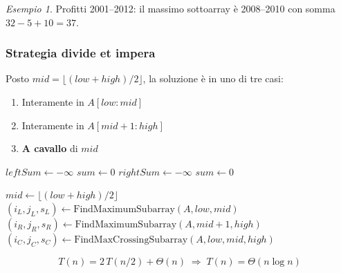 \documentclass[a4paper, 11pt]{article}
\theoremstyle{definition}
\theoremstyle{remark}
\newtheorem{esempio}{Esempio}[section]
\theoremstyle{remark}
\begin{document}
	\begin{esempio}
		Profitti 2001--2012: il massimo sottoarray è 2008--2010 con somma
		$32 - 5 + 10 = 37$.
	\end{esempio}
	
	\subsubsection*{Strategia divide et impera}
	
	Posto $mid = \lfloor(low+high)/2\rfloor$, la soluzione è in uno di tre casi:
	\begin{enumerate}
		\item Interamente in $A[low:mid]$
		\item Interamente in $A[mid+1:high]$
		\item \textbf{A cavallo} di $mid$
	\end{enumerate}
	
	\begin{algorithm}[H]
		\caption{FindMaxCrossingSubarray($A$, $low$, $mid$, $high$)}
		$\mathit{leftSum} \gets -\infty$\; $\mathit{sum} \gets 0$\;
		$\mathit{rightSum} \gets -\infty$\; $\mathit{sum} \gets 0$\;
		\;
	\end{algorithm}
	
	\begin{algorithm}[H]
		\caption{FindMaximumSubarray($A$, $low$, $high$)}
		$mid \gets \lfloor(low+high)/2\rfloor$\;
		$(i_L, j_L, s_L) \gets \text{FindMaximumSubarray}(A, low, mid)$\;
		$(i_R, j_R, s_R) \gets \text{FindMaximumSubarray}(A, mid+1, high)$\;
		$(i_C, j_C, s_C) \gets \text{FindMaxCrossingSubarray}(A,low,mid,high)$\;
		\;
	\end{algorithm}
	
	\[
	T(n) = 2\,T(n/2) + \Theta(n) \;\Rightarrow\; T(n) = \Theta(n \log n)
	\]
	
\end{document}

